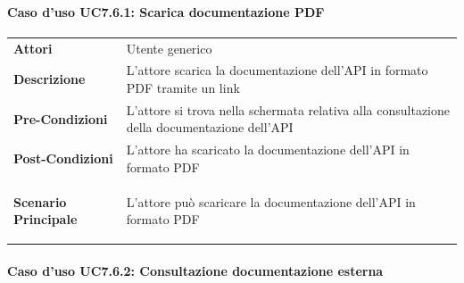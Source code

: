 \paragraph{Caso d'uso UC7.6.1: Scarica documentazione PDF}
\label{UC7_6_1}

\begin{minipage}{\linewidth}
	\begin{tabular}{ l | p{11cm}}
		\hline
		\rowcolor{Gray}
		\multicolumn{2}{c}{UC7.6.1 - Scarica documentazione PDF} \\
		\hline
		\textbf{Attori} & Utente generico \\
		\textbf{Descrizione} & L'attore scarica la documentazione dell'API in formato PDF tramite un link \\
		\textbf{Pre-Condizioni} & L'attore si trova nella schermata relativa alla consultazione della documentazione dell'API \\
		\textbf{Post-Condizioni} & L'attore ha scaricato la documentazione dell'API in formato PDF \\
		\textbf{Scenario Principale} & 
		\begin{enumerate*}[label=(\arabic*.),itemjoin={\newline}]
			\item L'attore può scaricare la documentazione dell'API in formato PDF
		\end{enumerate*}\\
	\end{tabular}
\end{minipage}

\paragraph{Caso d'uso UC7.6.2: Consultazione documentazione esterna}
\label{UC7_6_2}

